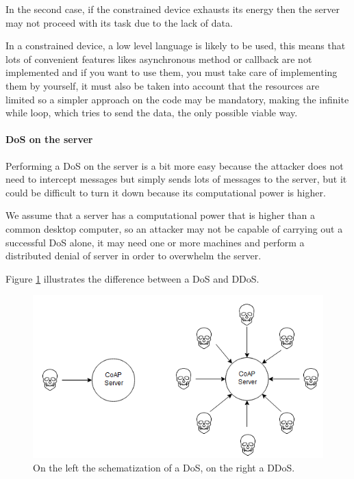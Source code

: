	In the second case, if the constrained device exhausts its energy then the server may not proceed with its task due to the lack of data.\newline
	
	In a constrained device, a low level language is likely to be used, this means that lots of convenient features likes asynchronous method or callback are not implemented and if you want to use them, you must take care of implementing them by yourself, it must also be taken into account that the resources are limited so a simpler approach on the code may be mandatory, making the infinite while loop, which tries to send the data, the only possible viable way.\newline
	
	\paragraph{DoS on the server}
	Performing a DoS on the server is a bit more easy because the attacker does not need to intercept messages but simply sends lots of messages to the server, but it could be difficult to turn it down because its computational power is higher.\newline
	
	We assume that a server has a computational power that is higher than a common desktop computer, so an attacker may not be capable of carrying out a successful DoS alone, it may need one or more machines and perform a distributed denial of server in order to overwhelm the server.\newline
	
	Figure \ref{fig:coap-vuln1} illustrates the difference between a DoS and DDoS.
	
	\begin{figure}
		\includegraphics[width=\linewidth]{coap-vuln-img1.png}
		\caption{On the left the schematization of a DoS, on the right a DDoS.}
		\label{fig:coap-vuln1}
	\end{figure}

